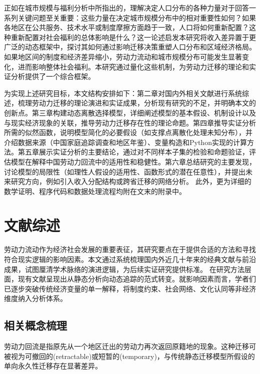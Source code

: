 \documentclass[
  a4paper,
  zihao=-4,
  fontset=mac,
  AutoFakeBold,
  AutoFakeSlant,
  oneside]{ctexbook}
\begin{document}
正如\textcite{desmetUrbanAccountingWelfare2013}在城市规模与福利分析中所指出的，理解决定人口分布的各种力量对于回答一系列关键问题至关重要：这些力量在决定城市规模分布中的相对重要性如何？如果各地区在公共服务、技术水平或制度摩擦方面趋于一致，人口将如何重新配置？这种重新配置对社会福利的总体影响是什么？这一论述启发本研究将收入差异置于更广泛的动态框架中，探讨其如何通过影响迁移决策重塑人口分布和区域经济格局。如果地区间的制度和经济差异缩小，劳动力流动和城市规模分布可能发生显著变化，进而影响整体社会福利。本研究通过量化这些机制，为劳动力迁移的理论和实证分析提供了一个综合框架。

为实现上述研究目标，本文结构安排如下：第二章对国内外相关文献进行系统综述，梳理劳动力迁移的理论演进和实证成果，分析现有研究的不足，并明确本文的创新点。第三章构建动态离散选择模型，详细阐述模型的基本假设、机制设计以及与现实经济现象的关联，推导劳动力迁移存在性的理论命题。第四章推导实证分析所需的似然函数，说明模型简化的必要假设（如支撑点离散化处理未知分布），并介绍数据来源（中国家庭追踪调查和地区年鉴）、变量构造和Python实现的计算方法。第五章展示实证分析的主要结论，通过对不同样本子集的检验和命题验证，评估模型在解释中国劳动力回流中的适用性和稳健性。第六章总结研究的主要发现，讨论模型的局限性（如理性人假设的适用性、函数形式的潜在任意性），并提出未来研究方向，例如引入收入分配结构或跨省迁移的网络分析。
此外，更为详细的数学证明、程序代码和数据处理流程均附在文末的附录中。



\chapter{文献综述}

劳动力流动作为经济社会发展的重要表征，其研究要点在于提供合适的方法和寻找符合现实逻辑的影响因素。本文通过系统梳理国内外近几十年来的经典文献与前沿成果，试图厘清学术脉络的演进逻辑，为后续实证研究提供标准。
在研究方法层面，现有文献呈现出从静态分析向动态追踪的范式转变。就影响因素而言，学者们已逐步突破传统经济变量的单一解释，将制度约束、社会网络、文化认同等非经济维度纳入分析体系。


\section{相关概念梳理}
劳动力回流是指原先从一个地区迁出的劳动力再次返回原籍地的现象。这种迁移可被视为可撤回的(retractable)或短暂的(temporary)，与传统静态迁移模型所假设的单向永久性迁移存在显著差异。
\end{document}

